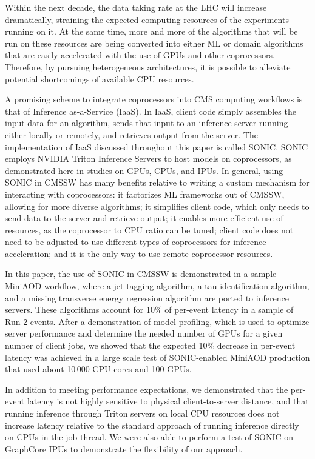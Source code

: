 Within the next decade, the data taking rate at the LHC will increase dramatically, straining the expected computing resources of the experiments running on it. At the same time, more and more of the algorithms that will be run on these resources are being converted into either ML or domain algorithms that are easily accelerated with the use of GPUs and other coprocessors. Therefore, by pursuing heterogeneous architectures, it is possible to alleviate potential shortcomings of available CPU resources.

A promising scheme to integrate coprocessors into CMS computing workflows is that of Inference as-a-Service (IaaS). In IaaS, client code simply assembles the input data for an algorithm, sends that input to an inference server running either locally or remotely, and retrieves output from the server. The implementation of IaaS discussed throughout this paper is called SONIC. SONIC employs NVIDIA Triton Inference Servers to host models on coprocessors, as demonstrated here in studies on GPUs, CPUs, and IPUs. In general, using SONIC in CMSSW has many benefits relative to writing a custom mechanism for interacting with coprocessors: it factorizes ML frameworks out of CMSSW, allowing for more diverse algorithms; it simplifies client code, which only needs to send data to the server and retrieve output; it enables more efficient use of resources, as the coprocessor to CPU ratio can be tuned; client code does not need to be adjusted to use different types of coprocessors for inference acceleration; and it is the only way to use remote coprocessor resources.

In this paper, the use of SONIC in CMSSW is demonstrated in a sample MiniAOD workflow, where a jet tagging algorithm, a tau identification algorithm, and a missing transverse energy regression algorithm are ported to inference servers. These algorithms account for 10\% of per-event latency in a sample of Run 2 \ttbar events. After a demonstration of model-profiling, which is used to optimize server performance and determine the needed number of GPUs for a given number of client jobs, we showed that the expected 10\% decrease in per-event latency was achieved in a large scale test of SONIC-enabled MiniAOD production that used about 10\,000 CPU cores and 100 GPUs.

In addition to meeting performance expectations, we demonstrated that the per-event latency is not highly sensitive to physical client-to-server distance, and that running inference through Triton servers on local CPU resources does not increase latency relative to the standard approach of running inference directly on CPUs in the job thread. We were also able to perform a test of SONIC on GraphCore IPUs to demonstrate the flexibility of our approach.

